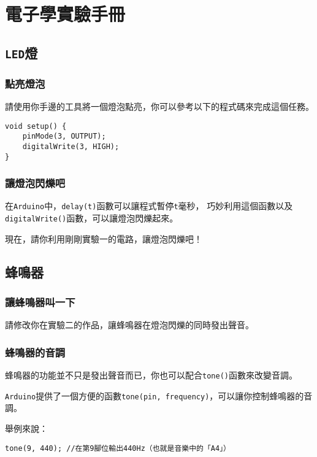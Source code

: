 \documentclass[12pt,a4paper]{article}
\begin{document}


\section{電子學實驗手冊}

\subsection{\texttt{LED}燈}

\subsubsection{點亮燈泡}
請使用你手邊的工具將一個燈泡點亮，你可以參考以下的程式碼來完成這個任務。
\begin{lstlisting}
void setup() {
    pinMode(3, OUTPUT);
    digitalWrite(3, HIGH);
}
\end{lstlisting}

\subsubsection{讓燈泡閃爍吧}
在\texttt{Arduino}中，\texttt{delay(t)}函數可以讓程式暫停\texttt{t}毫秒，
巧妙利用這個函數以及\texttt{digitalWrite()}函數，可以讓燈泡閃爍起來。

現在，請你利用剛剛實驗一的電路，讓燈泡閃爍吧！

\subsection{蜂鳴器}

\subsubsection{讓蜂鳴器叫一下}
請修改你在實驗二的作品，讓蜂鳴器在燈泡閃爍的同時發出聲音。

\subsubsection{蜂鳴器的音調}
蜂鳴器的功能並不只是發出聲音而已，你也可以配合\texttt{tone()}函數來改變音調。

\texttt{Arduino}提供了一個方便的函數\texttt{tone(pin, frequency)}，可以讓你控制蜂鳴器的音調。

舉例來說：
\begin{lstlisting}
tone(9, 440); //在第9腳位輸出440Hz（也就是音樂中的「A4」）
\end{lstlisting}
\end{document}
